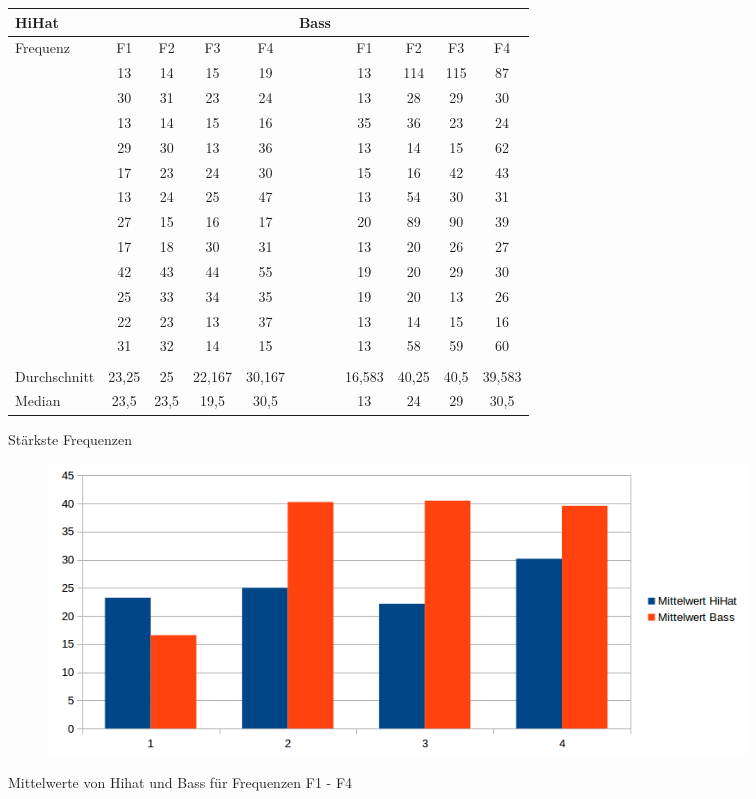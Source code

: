 \begin{figure}[H]
	\centering
	\caption{Stärkste Frequenzen}
	\begin{tabular}{l c c c c | l c c c c}
		HiHat &&&& &Bass \\
		\hline
		Frequenz & F1 & F2 & F3 & F4  & & F1 & F2 & F3 & F4\\	
		& 13 & 14 & 15 & 19  &&13& 114& 115& 87\\
		& 30 & 31 & 23 & 24 &&13& 28& 29& 30\\
		& 13& 14& 15& 16 &&35& 36& 23& 24\\
		& 29& 30& 13&36 &&13& 14& 15& 62\\
		& 17& 23&24& 30 	&&15& 16& 42& 43\\
		&13& 24& 25& 47	&&13& 54& 30& 31\\

		&27& 15& 16& 17	&&20& 89& 90& 39\\

		 &17& 18& 30& 31 &&13& 20& 26& 27\\

		&42& 43& 44& 55		&&19& 20& 29& 30\\

		 &25& 33& 34& 35 &&19& 20& 13& 26 \\

		&22& 23& 13& 37		&&13& 14& 15& 16\\

		&31& 32& 14& 15  &&13& 58& 59& 60\\
		\\
		\hline
		Durchschnitt & 23,25&	25	&22,167& 30,167 && 16,583	&40,25&	40,5&	39,583	\\
		Median & 23,5 &	23,5& 19,5	& 30,5 && 13 &	24	& 29	 &30,5 \\		 
		

	\end{tabular}
	\label{tab:FFT}
\end{figure}

\begin{figure}[H]
\centering
\begin{subfigure}{.5\textwidth}
		\includegraphics[scale=0.5]{figures/Mittelwert_hihatbass.png}
\end{subfigure}
\caption{Mittelwerte von Hihat und Bass für Frequenzen F1 - F4}
\label{fig:FFT_Mittelwerte}
\end{figure}


